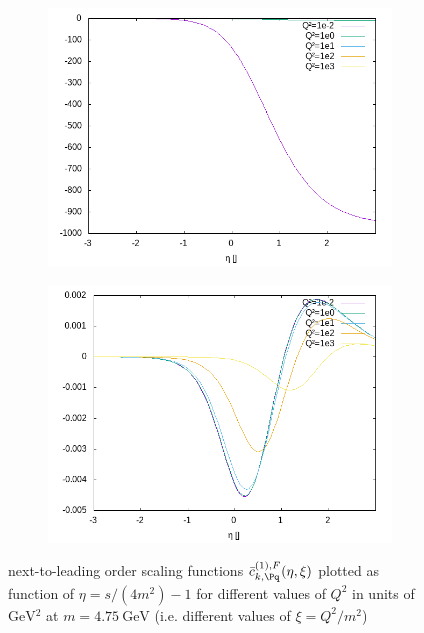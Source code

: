 \begin{figure}[ht!]
\begin{subfigure}[t]{.3\textwidth}
	\includegraphics[width=\textwidth]{../../img2/partonic/cqBarF1_AA_FL}
\end{subfigure}%
\begin{subfigure}[t]{.3\textwidth}
	\includegraphics[width=\textwidth]{../../img2/partonic/cqBarF1_AA_x2g1}
\end{subfigure}%
\caption{next-to-leading order scaling functions $\bar c_{k,\Pq}^{(1),F}(\eta,\xi)$ plotted as function of $\eta=s/(4m^2)-1$ for different values of $Q^2$ in units of $\si{\GeV^2}$ at $m=\SI{4.75}{\GeV}$ (i.e. different values of $\xi=Q^2/m^2$) }\label{fig:cqBarF1}
\end{figure}
